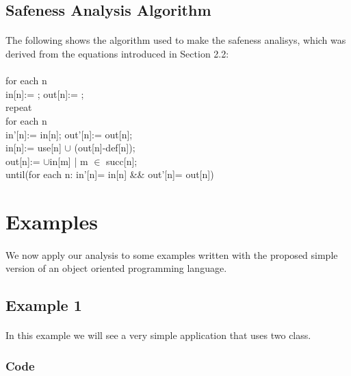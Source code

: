 \documentclass[letterpaper,twocolumn,10pt]{article}
\begin{document}
\subsection{Safeness Analysis Algorithm}
\paragraph{}
The following shows the algorithm used to make the safeness analisys, which was derived from the equations introduced in Section 2.2:\\
\\
for each n\\
in[n]:={ }; out[n]:={ };\\
repeat\\
for each n\\
in'[n]:= in[n]; out'[n]:= out[n];\\
in[n]:= use[n] $\cup$ (out[n]-def[n]);\\
out[n]:= $\cup${in[m] | m $\in$ succ[n]};\\
until(for each n: in'[n]= in[n] \&\& out'[n]= out[n])
       
        




\section{Examples}
\paragraph{}
We now apply our analysis to some examples written with the proposed simple version of an object oriented programming language.

\subsection{Example 1}
\paragraph{}
In this example we will see a very simple application that uses two class.
\subsubsection{Code}
\end{document}
